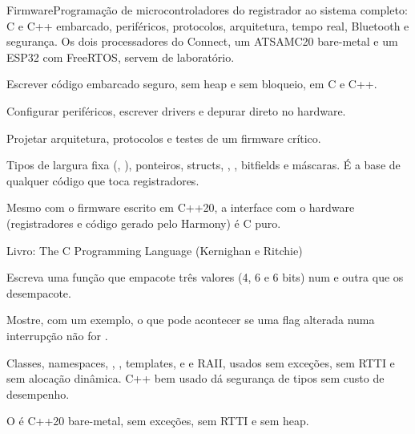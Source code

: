 \begin{parte}{Firmware}{Programação de microcontroladores do registrador ao sistema completo: C e C++ embarcado, periféricos, protocolos, arquitetura, tempo real, Bluetooth e segurança. Os dois processadores do Connect, um ATSAMC20 bare-metal e um ESP32 com FreeRTOS, servem de laboratório.}
  \item Escrever código embarcado seguro, sem heap e sem bloqueio, em C e C++.
  \item Configurar periféricos, escrever drivers e depurar direto no hardware.
  \item Projetar arquitetura, protocolos e testes de um firmware crítico.
\end{parte}


Tipos de largura fixa (, ), ponteiros, structs, , , bitfields e máscaras. É a base de qualquer código que toca registradores.

\begin{noproduto}
Mesmo com o firmware escrito em C++20, a interface com o hardware (registradores e código gerado pelo Harmony) é C puro.
\end{noproduto}

\begin{paraestudar}
  \item {}
  \item Livro: The C Programming Language (Kernighan e Ritchie)
\end{paraestudar}

\begin{pratique}
  \item Escreva uma função que empacote três valores (4, 6 e 6 bits) num  e outra que os desempacote.
  \item Mostre, com um exemplo, o que pode acontecer se uma flag alterada numa interrupção não for .
\end{pratique}

Classes, namespaces, , , templates,  e  e RAII, usados sem exceções, sem RTTI e sem alocação dinâmica. C++ bem usado dá segurança de tipos sem custo de desempenho.

\begin{noproduto}
O  é C++20 bare-metal, sem exceções, sem RTTI e sem heap.
\end{noproduto}

